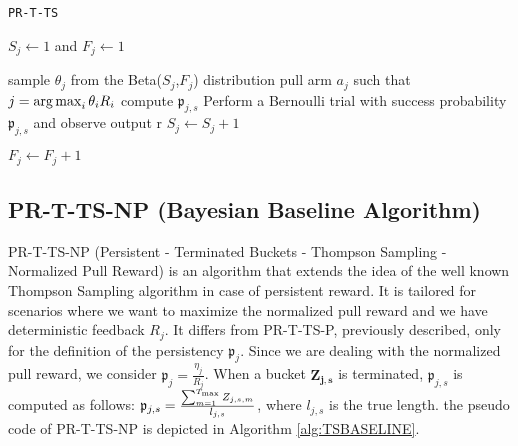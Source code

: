 \begin{algorithm}[H]
	\caption{\texttt{PR-T-TS}}
	\begin{scriptsize}
		\begin{algorithmic}[1]
			
			

			
			
			
			 
				\State $S_j \gets 1$ and $F_j \gets 1$
			\EndFor
			
			  
				\State sample $\theta_j$ from the Beta($S_j$,$F_j$) distribution
				\EndFor
			\State pull arm $a_j$ such that $j = \operatorname*{arg\,max}_i \theta_iR_i$
			 
				\State compute $\mathfrak{p}_{j,s}$
				\State Perform a Bernoulli trial with success probability $\mathfrak{p}_{j,s}$ and observe output r
				 \;
				\State $S_j \gets S_j + 1$ \;
				
				\Else
				\State $F_j \gets F_j + 1$ \;
				
				\EndIf
				\EndIf		
			\EndFor
			
			\EndFor
			\EndFor
			
			
			\EndFunction
			
		\end{algorithmic}
	\end{scriptsize}
	\label{alg:TSBASELINE}
\end{algorithm}

\subsection{PR-T-TS-NP (Bayesian Baseline Algorithm)}
PR-T-TS-NP (Persistent - Terminated Buckets - Thompson Sampling - Normalized Pull Reward) is an algorithm that extends the idea of the well known Thompson Sampling algorithm in case of persistent reward. It is tailored for scenarios where we want to maximize the normalized pull reward and we have deterministic feedback $R_j$. It differs from PR-T-TS-P, previously described, only for the definition of the persistency $\mathfrak{p}_{j}$. Since we are dealing with the normalized pull reward, we consider $\mathfrak{p}_{j} = \frac{\eta_j}{R_j}$. When a bucket $\boldsymbol{Z_{j,s}}$ is terminated, $\mathfrak{p}_{j,s}$ is computed as follows: $\mathfrak{p}_{j,s} = \frac{\sum_{m=1}^{T_{\textnormal{max}}} Z_{j,s,m}}{l_{j,s}}$, where $l_{j,s}$ is the true length. the pseudo code of PR-T-TS-NP  is depicted in Algorithm \ref{alg:TSBASELINE}.



